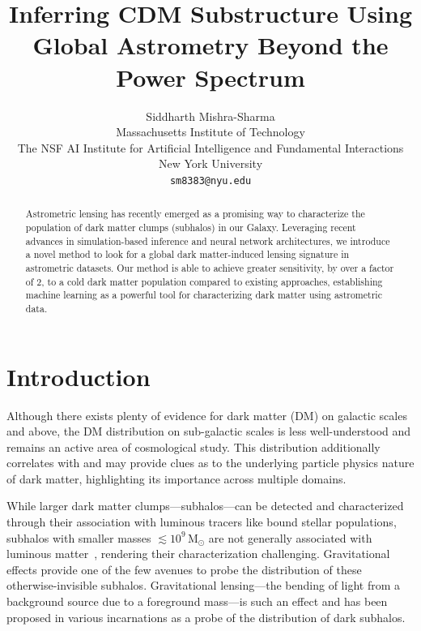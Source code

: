 \documentclass[]{article}
\title{Inferring CDM Substructure Using \\ Global Astrometry Beyond the Power Spectrum}
\author{
Siddharth Mishra-Sharma \\
Massachusetts Institute of Technology \\
The NSF AI Institute for Artificial Intelligence and Fundamental Interactions \\
New York University \\
\texttt{sm8383@nyu.edu} \\
}
\begin{document}
\maketitle

\begin{abstract}
Astrometric lensing has recently emerged as a promising way to characterize the population of dark matter clumps (subhalos) in our Galaxy. Leveraging recent advances in simulation-based inference and neural network architectures, we introduce a novel method to look for a global dark matter-induced lensing signature in astrometric datasets. Our method is able to achieve greater sensitivity, by over a factor of 2, to a cold dark matter population compared to existing approaches, establishing machine learning as a powerful tool for characterizing dark matter using astrometric data. 
\end{abstract}

\section{Introduction}
\label{sec:intro}

Although there exists plenty of evidence for dark matter (DM) on galactic scales and above,
the DM distribution on sub-galactic scales is less well-understood and remains an active area of cosmological study. This distribution additionally correlates with and may provide clues as to the underlying particle physics nature of dark matter, highlighting its importance across multiple domains. 

While larger dark matter clumps---subhalos---can be detected and characterized through their association with luminous tracers like bound stellar populations, subhalos with smaller masses $\lesssim 10^9\,\mathrm M_\odot$ are not generally associated with luminous matter~\cite{Fitts:2016usl,2017MNRAS.467.2019R}, rendering their characterization challenging. Gravitational effects provide one of the few avenues to probe the distribution of these otherwise-invisible subhalos. Gravitational lensing---the bending of light from a background source due to a foreground mass---is such an effect and has been proposed in various incarnations as a probe of the distribution of dark subhalos. 
\end{document}
